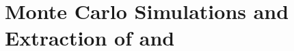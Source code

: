 \clearpage
%
\chapter{Monte Carlo Simulations and Extraction of \gones and \afones}
\label{cha:mcSim}





%








%
%

